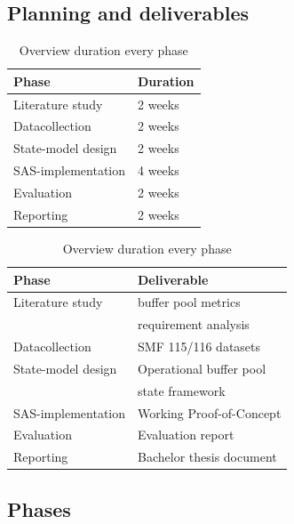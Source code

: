 \subsection{Planning and deliverables}
\begin{table}[h]
    \centering
    \renewcommand{\arraystretch}{1.3}
    \begin{tabular}{|l|l|}
        \hline
        \textbf{Phase} & \textbf{Duration} \\
        \hline
        Literature study        & 2 weeks  \\
        Datacollection  & 2 weeks  \\
        State-model design       & 2 weeks \\
        SAS-implementation          & 4 weeks \\
        Evaluation       & 2 weeks \\
        Reporting       & 2 weeks \\
        \hline
    \end{tabular}
    \caption{Overview duration every phase}
\end{table}
\begin{table}[h]
    \centering
    \renewcommand{\arraystretch}{1.3}
    \begin{tabular}{|l|l|}
        \hline
        \textbf{Phase} & \textbf{Deliverable} \\
        \hline
        Literature study        &  buffer pool metrics\\
                &   requirement analysis  \\
        Datacollection  & SMF 115/116 datasets  \\
        State-model design       & Operational buffer pool  \\
               & state framework \\
        SAS-implementation          & Working Proof-of-Concept \\
        Evaluation       & Evaluation report \\
        Reporting       & Bachelor thesis document \\
        \hline
    \end{tabular}
    \caption{Overview duration every phase}
\end{table}



\subsection{Phases}

